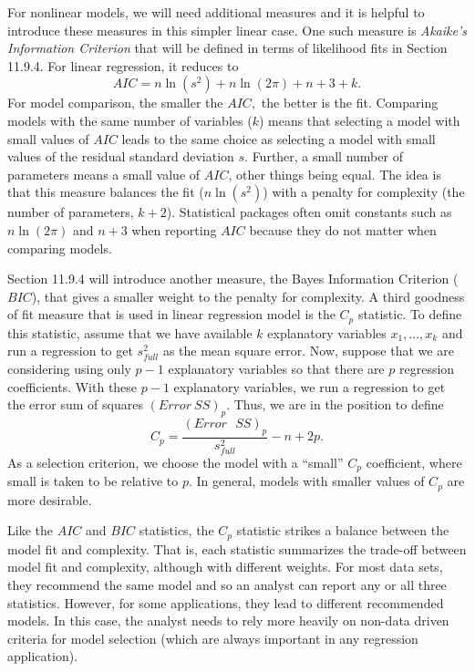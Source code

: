 For nonlinear models, we will need additional measures and it is
helpful to introduce these measures in this simpler linear case. One
such measure is \emph{Akaike's Information Criterion} that will be
defined in terms of likelihood fits in Section 11.9.4. For linear
regression, it reduces to
\begin{equation}\label{E5:AIC}
AIC = n \ln (s^2) + n \ln (2 \pi) +n  + 3 +k.
\end{equation}
For model comparison, the smaller the $AIC,$ the better is the fit.
Comparing models with the same number of variables ($k$) means that
selecting a model with small values of $AIC$ leads to the same
choice as selecting a model with small values of the residual
standard deviation $s$. Further, a small number of parameters means
a small value of $AIC$, other things being equal. The idea is that
this measure balances the fit ($n \ln (s^2)$) with a penalty for
complexity (the number of parameters, $k+2$). Statistical packages
often omit constants such as $n \ln (2 \pi)$ and $n+3$ when
reporting $AIC$ because they do not matter when comparing models.

Section 11.9.4 will introduce another measure, the Bayes Information
Criterion ($BIC$), that gives a smaller weight to the penalty for
complexity. A third goodness of fit measure that is used in linear
regression model is the $C_p$ statistic. To define this statistic,
assume that we have available $k$ explanatory variables
$x_1,...,x_{k}$ and run a regression to get $s_{full}^2$ as the mean
square error. Now, suppose that we are considering using only $p-1$
explanatory variables so that there are $p$ regression coefficients.
With these $p-1$ explanatory variables, we run a regression to get
the error sum of squares $(Error~SS)_p$. Thus, we are in the
position to define
\begin{equation*}
C_{p}=\frac{(Error\text{ }SS)_p}{s_{full}^2}- n + 2p.
\end{equation*}
As a selection criterion, we choose the model with a ``small''
$C_{p}$ coefficient, where small is taken to be relative to $p$. In
general, models with smaller values of $C_{p}$ are more desirable.

Like the $AIC$ and $BIC$ statistics, the $C_{p}$ statistic strikes a
balance between the model fit and complexity. That is, each
statistic summarizes the trade-off between model fit and complexity,
although with different weights. For most data sets, they recommend
the same model and so an analyst can report any or all three
statistics. However, for some applications, they lead to different
recommended models. In this case, the analyst needs to rely more
heavily on non-data driven criteria for model selection (which are
always important in any regression application).


